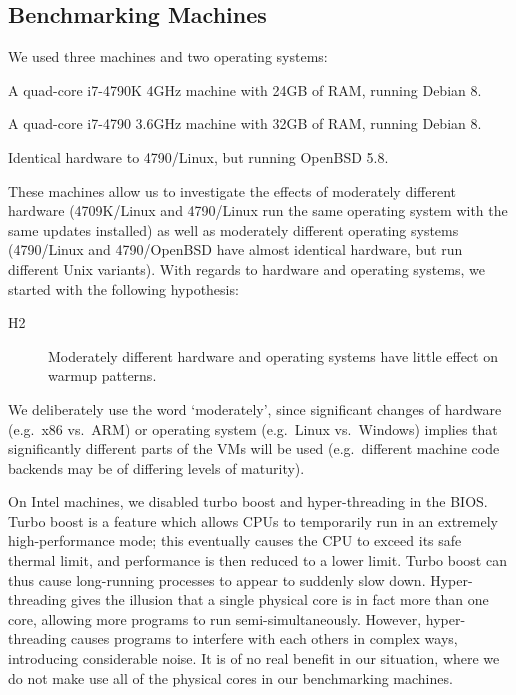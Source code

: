 \documentclass[10pt,preprint]{sigplanconf}
\newcommand{\hyptwo}{H2\xspace}
\newcommand{\bencherthree}{4709K/Linux\xspace}
\newcommand{\bencherfive}{4790/Linux\xspace}
\newcommand{\benchersix}{4790/OpenBSD\xspace}
\begin{document}
\subsection{Benchmarking Machines}

We used three machines and two operating systems:
\begin{description*}
  \item[\bencherthree] A quad-core i7-4790K 4GHz machine with 24GB of RAM, running Debian 8.
  \item[\bencherfive] A quad-core i7-4790 3.6GHz machine with 32GB of RAM, running Debian 8.
  \item[\benchersix] Identical hardware to \bencherfive, but running OpenBSD 5.8.
\end{description*}
These machines allow us to investigate the effects of moderately different
hardware (\bencherthree and \bencherfive run the same operating system with the
same updates installed) as well as moderately different operating systems
(\bencherfive and \benchersix have almost identical hardware, but run different
Unix
variants). With regards to hardware and operating systems, we started with the
following hypothesis:
\begin{description}
  \item[\hyptwo] Moderately different hardware and operating systems have little effect on warmup patterns.
\end{description}
We deliberately use the word `moderately', since significant changes of hardware
(e.g.~x86 vs.~ARM) or operating system (e.g.~Linux vs.~Windows) implies that
significantly different parts of the VMs will be used (e.g.~different machine
code backends may be of differing levels of maturity).

On Intel machines, we disabled turbo boost and hyper-threading in the BIOS. Turbo boost is a
feature which allows CPUs to temporarily run in an extremely high-performance
mode; this eventually causes the CPU to exceed its safe thermal limit, and
performance is then reduced to a lower limit. Turbo boost can thus cause long-running processes to
appear to suddenly slow down. Hyper-threading gives the illusion that a single
physical core is in fact more than one core, allowing more programs to
run semi-simultaneously. However, hyper-threading causes programs to interfere
with each others in complex ways, introducing considerable noise. It
is of no real benefit in our situation, where we do not make use all of the
physical cores in our benchmarking machines.
\end{document}
